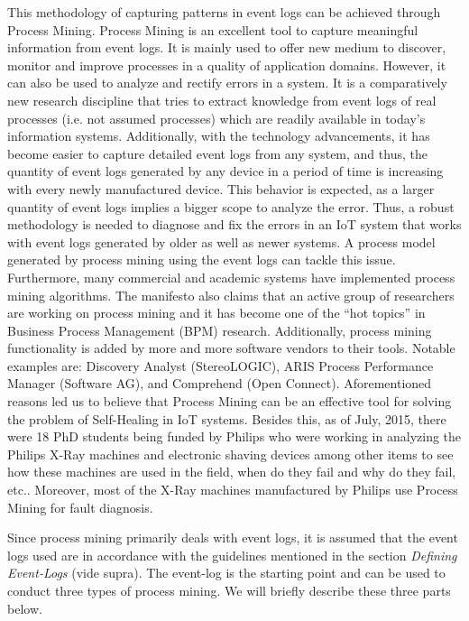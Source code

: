 This methodology of capturing patterns in event logs can be achieved through Process Mining. Process Mining is an excellent tool to capture meaningful information from event logs. It is mainly used to offer new medium to discover, monitor and improve processes in a quality of application domains. However, it can also be used to analyze and rectify errors in a system. It is a comparatively new research discipline that tries to extract knowledge from event logs of real processes (i.e. not assumed processes) which are readily available in today’s information systems. Additionally, with the technology advancements, it has become easier to capture detailed event logs from any system, and thus, the quantity of event logs generated by any device in a period of time is increasing with every newly manufactured device. This behavior is expected, as a larger quantity of event logs implies a bigger scope to analyze the error. Thus, a robust methodology is needed to diagnose and fix the errors in an IoT system that works with event logs generated by older as well as newer systems. A process model generated by process mining using the event logs can tackle this issue. Furthermore, many commercial and academic systems have implemented process mining algorithms. The manifesto\cite{Vossen2012} also claims that an active group of researchers are working on process mining and it has become one of the “hot topics” in Business Process Management (BPM) research. Additionally, process mining functionality is added by more and more software vendors to their tools. Notable examples are: Discovery Analyst (StereoLOGIC), ARIS Process Performance Manager (Software AG), and Comprehend (Open Connect). Aforementioned reasons led us to believe that Process Mining can be an effective tool for solving the problem of Self-Healing in IoT systems. Besides this, as of July, 2015, there were 18 PhD students being funded by Philips who were working in analyzing the Philips X-Ray machines and electronic shaving devices among other items to see how these machines are used in the field, when do they fail and why do they fail, etc.\cite{Aalst2015}. Moreover, most of the X-Ray machines manufactured by Philips use Process Mining for fault diagnosis\cite{VanDerAalst2012a,Vossen2012}.

Since process mining primarily deals with event logs, it is assumed that the event logs used are in accordance with the guidelines mentioned in the section \textit{Defining Event-Logs} (vide supra). The event-log is the starting point and can be used to conduct three types of process mining. We will briefly describe these three parts below.

